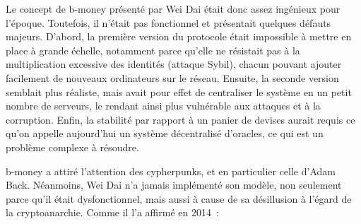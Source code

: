 Le concept de b-money présenté par Wei Dai était donc assez ingénieux pour l'époque. Toutefois, il n'était pas fonctionnel et présentait quelques défauts majeurs. D'abord, la première version du protocole était impossible à mettre en place à grande échelle, notamment parce qu'elle ne résistait pas à la multiplication excessive des identités (attaque Sybil), chacun pouvant ajouter facilement de nouveaux ordinateurs sur le réseau. Ensuite, la seconde version semblait plus réaliste, mais avait pour effet de centraliser le système en un petit nombre de serveurs, le rendant ainsi plus vulnérable aux attaques et à la corruption. Enfin, la stabilité par rapport à un panier de devises aurait requis ce qu'on appelle aujourd'hui un système décentralisé d'oracles, ce qui est un problème complexe à résoudre. %

b-money a attiré l'attention des cypherpunks, et en particulier celle d'Adam Back. Néanmoins, Wei Dai n'a jamais implémenté son modèle, non seulement parce qu'il était dysfonctionnel, mais aussi à cause de sa désillusion à l'égard de la cryptoanarchie. Comme il l'a affirmé en 2014~:

